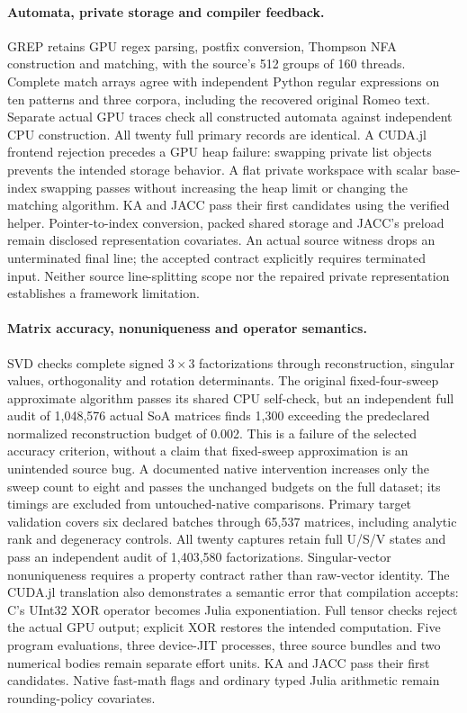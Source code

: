 \paragraph{Automata, private storage and compiler feedback.}
GREP retains GPU regex parsing, postfix conversion, Thompson NFA construction and matching, with the source's 512 groups of 160 threads. Complete match arrays agree with independent Python regular expressions on ten patterns and three corpora, including the recovered original Romeo text. Separate actual GPU traces check all constructed automata against independent CPU construction. All twenty full primary records are identical. A CUDA.jl frontend rejection precedes a GPU heap failure: swapping private list objects prevents the intended storage behavior. A flat private workspace with scalar base-index swapping passes without increasing the heap limit or changing the matching algorithm. KA and JACC pass their first candidates using the verified helper. Pointer-to-index conversion, packed shared storage and JACC's preload remain disclosed representation covariates. An actual source witness drops an unterminated final line; the accepted contract explicitly requires terminated input. Neither source line-splitting scope nor the repaired private representation establishes a framework limitation.

\paragraph{Matrix accuracy, nonuniqueness and operator semantics.}
SVD checks complete signed $3\times3$ factorizations through reconstruction, singular values, orthogonality and rotation determinants. The original fixed-four-sweep approximate algorithm passes its shared CPU self-check, but an independent full audit of 1,048,576 actual SoA matrices finds 1,300 exceeding the predeclared normalized reconstruction budget of 0.002. This is a failure of the selected accuracy criterion, without a claim that fixed-sweep approximation is an unintended source bug. A documented native intervention increases only the sweep count to eight and passes the unchanged budgets on the full dataset; its timings are excluded from untouched-native comparisons. Primary target validation covers six declared batches through 65,537 matrices, including analytic rank and degeneracy controls. All twenty captures retain full U/S/V states and pass an independent audit of 1,403,580 factorizations. Singular-vector nonuniqueness requires a property contract rather than raw-vector identity. The CUDA.jl translation also demonstrates a semantic error that compilation accepts: C's UInt32 XOR operator \texttt{} becomes Julia exponentiation. Full tensor checks reject the actual GPU output; explicit XOR restores the intended computation. Five program evaluations, three device-JIT processes, three source bundles and two numerical bodies remain separate effort units. KA and JACC pass their first candidates. Native fast-math flags and ordinary typed Julia arithmetic remain rounding-policy covariates.

